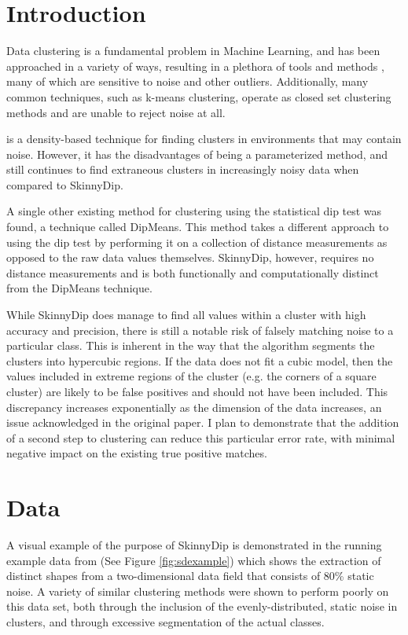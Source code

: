 \documentclass{sig-alternate-05-2015}
\begin{document}
\section{Introduction}
Data clustering is a fundamental problem in Machine Learning, and has been approached in a variety of ways, resulting in a plethora of tools and methods \cite{ClusteringMethods}, many of which are sensitive to noise and other outliers. Additionally, many common techniques, such as k-means clustering, operate as closed set clustering methods and are unable to reject noise at all.

\cite{DBSCAN} is a density-based technique for finding clusters in environments that may contain noise. However, it has the disadvantages of being a parameterized method, and still continues to find extraneous clusters in increasingly noisy data when compared to SkinnyDip.

A single other existing method for clustering using the statistical dip test was found, a technique called DipMeans\cite{dipmeans}. This method takes a different approach to using the dip test by performing it on a collection of distance measurements as opposed to the raw data values themselves. SkinnyDip, however, requires no distance measurements  and is both functionally and computationally distinct from the DipMeans technique.

While SkinnyDip does manage to find all values within a cluster with high accuracy and precision, there is still a notable risk of falsely matching noise to a particular class. This is inherent in the way that the algorithm segments the clusters into hypercubic regions. If the data does not fit a cubic model, then the values included in extreme regions of the cluster (e.g. the corners of a square cluster) are likely to be false positives and should not have been included. This discrepancy increases exponentially as the dimension of the data increases, an issue acknowledged in the original paper\cite{skinnydip}. I plan to demonstrate that the addition of a second step to clustering can reduce this particular error rate, with minimal negative impact on the existing true positive matches.

\section{Data} \label{data}
A visual example of the purpose of SkinnyDip is demonstrated in the running example data from \cite{skinnydip} (See Figure \ref{fig:sdexample}) which shows the extraction of distinct shapes from a two-dimensional data field that consists of 80\% static noise. A variety of similar clustering methods were shown to perform poorly on this data set, both through the inclusion of the evenly-distributed, static noise in clusters, and through excessive segmentation of the actual classes.
\end{document}
